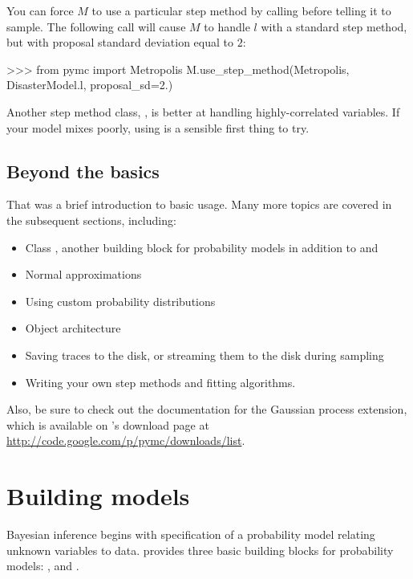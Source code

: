 \documentclass[]{jss}
\begin{document}
You can force $M$ to use a particular step method by calling  before telling it to sample. The following call will cause $M$ to handle $l$ with a standard  step method, but with proposal standard deviation equal to $2$:
\begin{CodeInput}
>>> from pymc import Metropolis
M.use_step_method(Metropolis, DisasterModel.l, proposal_sd=2.)
\end{CodeInput}

Another step method class, , is better at handling highly-correlated variables. If your model mixes poorly, using  is a sensible first thing to try.



\subsection{Beyond the basics}
That was a brief introduction to basic  usage. Many more topics are covered in the subsequent sections, including:
\begin{itemize}
   \item Class , another building block for probability models in addition to  and 
   \item Normal approximations
   \item Using custom probability distributions
   \item Object architecture
   \item Saving traces to the disk, or streaming them to the disk during sampling
   \item Writing your own step methods and fitting algorithms.
\end{itemize}
Also, be sure to check out the documentation for the Gaussian process extension,
which is available on 's
download page at \href{http://code.google.com/p/pymc/downloads/list}{http://code.google.com/p/pymc/downloads/list}.



\section{Building models}
\label{chap:modelbuilding}

Bayesian inference begins with specification of a probability model relating unknown variables to data.  provides three basic building blocks for probability models: ,  and .
\end{document}
